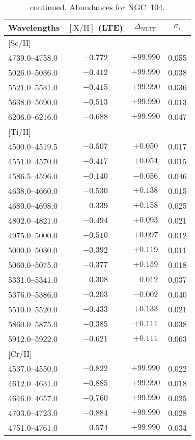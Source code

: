 \documentclass{aa}
\begin{document}
\begin{appendix}
\addtocounter{table}{-1}
\begin{table}
\caption{continued. Abundances for NGC~104.}
{\tiny
\begin{tabular}{lccc} \\ \hline\hline
Wavelengths & $\mathrm{[X/H]}$ (LTE) & $\Delta_\mathrm{NLTE}$ & $\sigma_i$ \\ \hline
% 
\mbox{[Sc/H]} \\
4739.0--4758.0 & $-0.772$ & $+99.990$ & 0.055\\
5026.0--5036.0 & $-0.412$ & $+99.990$ & 0.038\\
5521.0--5531.0 & $-0.415$ & $+99.990$ & 0.036\\
5638.0--5690.0 & $-0.513$ & $+99.990$ & 0.013\\
6206.0--6216.0 & $-0.688$ & $+99.990$ & 0.047\\
\mbox{[Ti/H]} \\
4500.0--4519.5 & $-0.507$ & $+0.050$ & 0.017\\
4551.0--4570.0 & $-0.417$ & $+0.054$ & 0.015\\
4586.5--4596.0 & $-0.140$ & $-0.056$ & 0.046\\
4638.0--4660.0 & $-0.530$ & $+0.138$ & 0.015\\
4680.0--4698.0 & $-0.339$ & $+0.158$ & 0.025\\
4802.0--4821.0 & $-0.494$ & $+0.093$ & 0.021\\
4975.0--5000.0 & $-0.510$ & $+0.097$ & 0.012\\
5000.0--5030.0 & $-0.392$ & $+0.119$ & 0.011\\
5060.0--5075.0 & $-0.377$ & $+0.159$ & 0.018\\
5331.0--5341.0 & $-0.308$ & $-0.012$ & 0.037\\
5376.0--5386.0 & $-0.203$ & $-0.002$ & 0.040\\
5510.0--5520.0 & $-0.433$ & $+0.133$ & 0.021\\
5860.0--5875.0 & $-0.385$ & $+0.111$ & 0.038\\
5912.0--5922.0 & $-0.621$ & $+0.111$ & 0.063\\
\mbox{[Cr/H]} \\
4537.0--4550.0 & $-0.822$ & $+99.990$ & 0.022\\
4612.0--4631.0 & $-0.885$ & $+99.990$ & 0.018\\
4646.0--4657.0 & $-0.760$ & $+99.990$ & 0.025\\
4703.0--4723.0 & $-0.884$ & $+99.990$ & 0.028\\
4751.0--4761.0 & $-0.574$ & $+99.990$ & 0.034\\

\end{tabular}}
\end{table}
\end{appendix}
\end{document}
